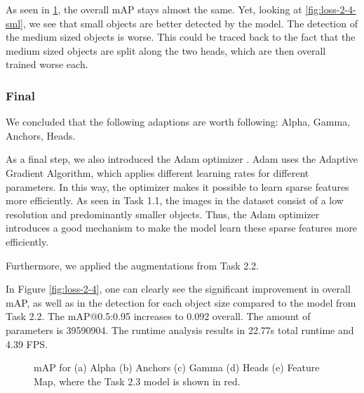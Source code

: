 \documentclass{article}
\begin{document}
As seen in \ref{fig:loss-2-4-mAP}, the overall mAP stays almost the same. Yet, looking at \ref{fig:loss-2-4-sml}, we see that small objects are better detected by the model. The detection of the medium sized objects is worse. This could be traced back to the fact that the medium sized objects are split along the two heads, which are then overall trained worse each.


\subsubsection*{Final}
We concluded that the following adaptions are worth following: Alpha, Gamma, Anchors, Heads.

As a final step, we also introduced the Adam optimizer \cite{kingma2014adam}. Adam uses the Adaptive Gradient Algorithm, which applies different learning rates for different parameters. In this way, the optimizer makes it possible to learn sparse features more efficiently. As seen in Task 1.1, the images in the dataset consist of a low resolution and predominantly smaller objects. Thus, the Adam optimizer introduces a good mechanism to make the model learn these sparse features more efficiently.

Furthermore, we applied the augmentations from Task 2.2.

In Figure \ref{fig:loss-2-4}, one can clearly see the significant improvement in overall mAP, as well as in the detection for each object size compared to the model from Task 2.2. The mAP@0.5:0.95 increases to 0.092 overall. The amount of parameters is 39590904. The runtime analysis results in 22.77s total runtime and 4.39 FPS.

\begin{figure}[t!]
    \centering
    \subfigure[]{}
    \subfigure[]{}
    \subfigure[]{}
    \subfigure[]{}
    \subfigure[]{} 
    \caption{mAP for (a) Alpha (b) Anchors (c) Gamma (d) Heads (e) Feature Map, where the Task 2.3 model is shown in red.}
    \label{fig:loss-2-4-mAP}
\end{figure}
\end{document}
